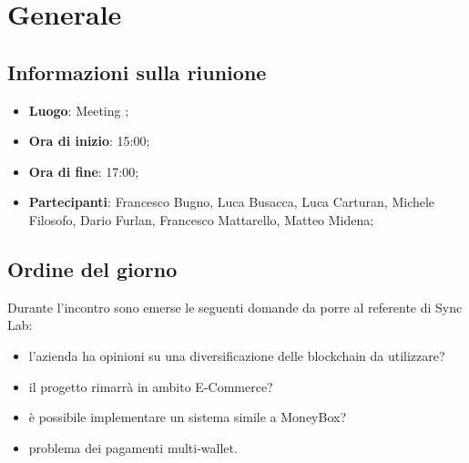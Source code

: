 \section{Generale}

\vspace{10pt}


\subsection{Informazioni sulla riunione}
\begin{itemize}
	\item \textbf{Luogo}: Meeting \glo{};
	\item \textbf{Ora di inizio}: 15:00;
	\item \textbf{Ora di fine}: 17:00;
	\item \textbf{Partecipanti}: Francesco Bugno, Luca Busacca, Luca Carturan, Michele Filosofo, Dario Furlan, Francesco Mattarello, Matteo Midena;
\end{itemize}

\vspace{5pt}

\subsection{Ordine del giorno}
Durante l'incontro sono emerse le seguenti domande da porre al referente di Sync Lab:
\begin{itemize}
	\item l'azienda ha opinioni su una diversificazione delle blockchain\glo{} da utilizzare?
	\item il progetto rimarrà in ambito E-Commerce\glo?
	\item è possibile implementare un sistema simile a MoneyBox\glo?
	\item problema dei pagamenti multi-wallet\glo{}.
\end{itemize}
